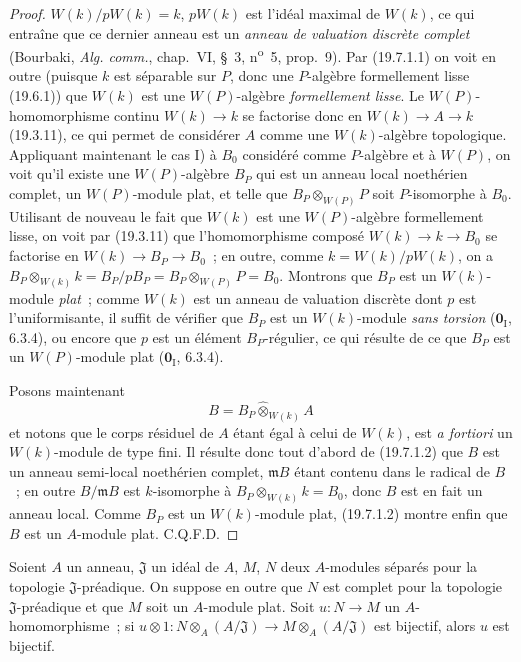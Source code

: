 \begin{proof}

$W(k)/pW(k)=k$, $pW(k)$ est l'idéal maximal de $W(k)$, ce qui entraîne que ce
dernier anneau est un \emph{anneau de valuation discrète complet} (Bourbaki,
\emph{Alg. comm.}, chap.~VI, §~3, n\textsuperscript{o}~5, prop.~9). Par
(19.7.1.1) on voit en outre (puisque $k$ est séparable sur $P$, donc une
$P$-algèbre formellement lisse (19.6.1)) que $W(k)$ est une $W(P)$-algèbre
\emph{formellement lisse}. Le $W(P)$-homomorphisme continu $W(k)\to k$ se
factorise donc en $W(k)\to A\to k$ (19.3.11), ce qui permet de considérer $A$
comme une $W(k)$-algèbre topologique. Appliquant maintenant le cas I) à $B_0$
considéré comme $P$-algèbre et à $W(P)$, on voit qu'il existe une
$W(P)$-algèbre $B_P$ qui est un anneau local noethérien complet, un
$W(P)$-module plat, et telle que $B_P\otimes_{W(P)}P$ soit $P$-isomorphe à
$B_0$. Utilisant de nouveau le fait que $W(k)$ est une $W(P)$-algèbre
formellement lisse, on voit par (19.3.11) que l'homomorphisme composé
$W(k)\to k\to B_0$ se factorise en $W(k)\to B_P\to B_0$~; en outre, comme
$k=W(k)/pW(k)$, on a
$B_P\otimes_{W(k)}k=B_P/pB_P=B_P\otimes_{W(P)}P=B_0$. Montrons que $B_P$ est
un $W(k)$-module \emph{plat}~; comme $W(k)$ est un anneau de valuation discrète
dont $p$ est l'uniformisante, il suffit de vérifier que $B_P$ est un
$W(k)$-module \emph{sans torsion} ($\mathbf 0_{\mathrm I}$, 6.3.4), ou encore
que $p$ est un élément $B_P$-régulier, ce qui résulte de ce que $B_P$ est un
$W(P)$-module plat ($\mathbf 0_{\mathrm I}$, 6.3.4).

Posons maintenant
\[
  B=B_P\widehat\otimes_{W(k)}A
\]
et notons que le corps résiduel de $A$ étant égal à celui de $W(k)$, est
\emph{a fortiori} un $W(k)$-module de type fini. Il résulte donc tout d'abord
de (19.7.1.2) que $B$ est un anneau semi-local noethérien complet,
$\mathfrak mB$ étant contenu dans le radical de $B$~; en outre
$B/\mathfrak mB$ est $k$-isomorphe à
$B_P\otimes_{W(k)}k=B_0$, donc $B$ est en fait un anneau local. Comme $B_P$
est un $W(k)$-module plat, (19.7.1.2) montre enfin que $B$ est un $A$-module
plat. C.Q.F.D.
\end{proof}

\begin{lemma}[19.7.1.4]
\label{0.19.7.1.4-fr}
Soient $A$ un anneau, $\mathfrak J$ un idéal de $A$, $M$, $N$ deux $A$-modules
séparés pour la topologie $\mathfrak J$-préadique. On suppose en outre que $N$
est complet pour la topologie $\mathfrak J$-préadique et que $M$ soit un
$A$-module plat. Soit $u:N\to M$ un $A$-homomorphisme~; si
$u\otimes1:N\otimes_A(A/\mathfrak J)\to M\otimes_A(A/\mathfrak J)$ est
bijectif, alors $u$ est bijectif.
\end{lemma}

